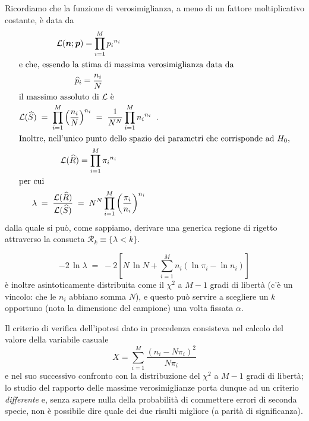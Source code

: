 Ricordiamo che la funzione di verosimiglianza, a meno di un
fattore moltiplicativo costante, \`e data da
\begin{gather*}
  \mathcal{L} ( \boldsymbol{n}; \boldsymbol{p} ) =
    \prod_{i=1}^M {p_i}^{n_i} \\
  \intertext{e che, essendo la stima di massima
    verosimiglianza data da}
  \widehat p_i = \frac{n_i}{N} \\
  \intertext{il massimo assoluto di $\mathcal{L}$ \`e}
  \mathcal{L} (\widehat S) \; = \; \prod_{i=1}^M \left(
    \frac{n_i}{N} \right)^{n_i} \; = \; \frac{1}{N^N}
    \prod_{i=1}^M {n_i}^{n_i} \;\; . \\
  \intertext{Inoltre, nell'unico punto dello spazio dei
    parametri che corrisponde ad $H_0$,}
  \mathcal{L} (\widehat R) = \prod_{i=1}^M {\pi_i}^{n_i} \\
  \intertext{per cui}
  \lambda \; = \; \frac{\mathcal{L} (\widehat R)}{\mathcal{L}
    (\widehat S)} \; = \; N^N \prod_{i=1}^M \left(
    \frac{\pi_i}{n_i} \right)^{n_i}
\end{gather*}
dalla quale si pu\`o, come sappiamo, derivare una generica
regione di rigetto attraverso la consueta $\mathcal{R}_k
\equiv \{ \lambda < k \}$.

\begin{equation*}
  -2 \, \ln \lambda \; = \; -2 \left[ N \, \ln N +
    \sum_{i=1}^M n_i \left( \ln \pi_i - \ln n_i \right)
    \right]
\end{equation*}
\`e inoltre asintoticamente distribuita come il $\chi^2$ a
$M-1$ gradi di libert\`a (c'\`e un vincolo: che le $n_i$
abbiano somma $N$), e questo pu\`o servire a scegliere un
$k$ opportuno (nota la dimensione del campione) una volta
fissata $\alpha$.

Il criterio di verifica dell'ipotesi dato in precedenza
consisteva nel calcolo del valore della variabile casuale
\begin{equation*}
  X = \sum_{i=1}^M \frac{ \left( n_i - N \pi_i \right)^2 }{
    N \pi_i }
\end{equation*}
e nel suo successivo confronto con la distribuzione del
$\chi^2$ a $M-1$ gradi di libert\`a; lo studio del rapporto
delle massime verosimiglianze porta dunque ad un criterio
\emph{differente} e, senza sapere nulla della probabilit\`a
di commettere errori di seconda specie, non \`e possibile
dire quale dei due risulti migliore (a parit\`a di
significanza).

